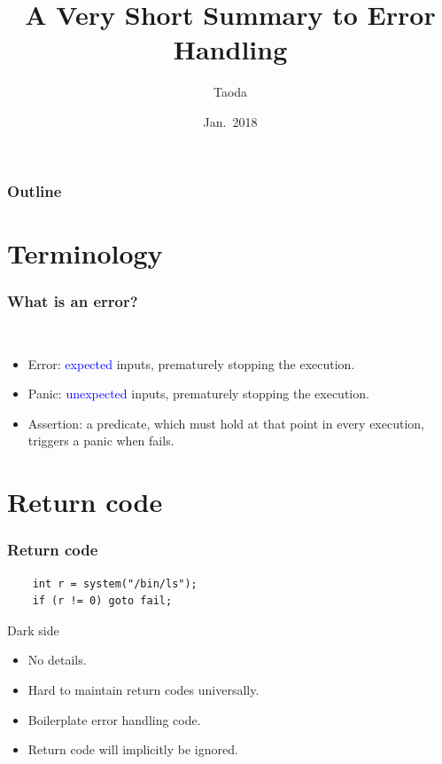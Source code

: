 \documentclass[lualatex]{beamer}
\title[Errors]{A Very Short Summary to Error Handling}
\author{Taoda}
\institute{YITU tech}
\date{Jan.\ 2018}
\begin{document}
\begin{frame}
\titlepage
\end{frame}

\begin{frame}
  \frametitle{Outline}
  \tableofcontents
\end{frame}

\section{Terminology}

\begin{frame}
  \frametitle{What is an error?}
  \begin{block}{~}
    \begin{itemize}
    \item Error: \textcolor{blue}{expected} inputs, prematurely stopping the execution.
    \item Panic: \textcolor{blue}{unexpected} inputs, prematurely stopping the execution.
    \item Assertion: a predicate, which must hold at that point in every execution, triggers a panic when fails.
    \end{itemize}
  \end{block}
\end{frame}

\section{Return code}

\begin{frame}[fragile]
  \frametitle{Return code}

  \begin{verbatim}
    int r = system("/bin/ls");
    if (r != 0) goto fail;
  \end{verbatim}

  \begin{block}{Dark side}
    \begin{itemize}
    \item No details.
    \item Hard to maintain return codes universally.
    \item Boilerplate error handling code.
    \item Return code will implicitly be ignored.
    \end{itemize}
  \end{block}
\end{frame}
\end{document}
